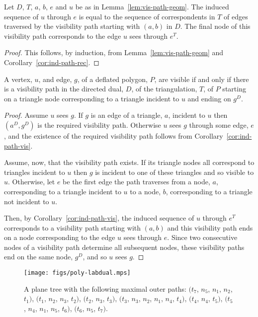 \documentclass{patmorin}
\begin{document}
\begin{cor}
  \label{cor:ind-path-vis}
  Let $D$, $T$, $a$, $b$, $e$ and $u$ be as in
  Lemma~\ref{lem:vis-path-geom}.  The induced sequence of $u$ through
  $e$ is equal to the sequence of correspondents in $T$ of edges
  traversed by the visibility path starting with $(a,b)$ in $D$.  The
  final node of this visibility path corresponds to the edge $u$ sees
  through $e^T$.
\end{cor}
\iffullversion
\begin{proof}
  This follows, by induction, from Lemma~\ref{lem:vis-path-geom} and
  Corollary~\ref{cor:ind-path-rec}.
\end{proof}
\fi

\begin{theorem}
  \label{thm:dd-det-ve}
  A vertex, $u$, and edge, $g$, of a deflated polygon, $P$, are
  visible if and only if there is a visibility path in the directed
  dual, $D$, of the triangulation, $T$, of $P$ starting on a triangle
  node corresponding to a triangle incident to $u$ and ending on
  $g^D$.
\end{theorem}
\begin{proof}
  Assume $u$ sees $g$.  If $g$ is an edge of a triangle, $a$, incident
  to $u$ then $(a^D, g^D)$ is the required visibility path.  Otherwise
  $u$ sees $g$ through some edge, $e$, and the existence of the
  required visibility path follows from
  Corollary~\ref{cor:ind-path-vis}.
  
  Assume, now, that the visibility path exists.  If its triangle nodes
  all correspond to triangles incident to $u$ then $g$ is incident to
  one of these triangles and so visible to $u$.  Otherwise, let $e$ be
  the first edge the path traverses from a node, $a$, corresponding to
  a triangle incident to $u$ to a node, $b$, corresponding to a
  triangle not incident to $u$.
  
  Then, by Corollary~\ref{cor:ind-path-vis}, the induced sequence of
  $u$ through $e^T$ corresponds to a visibility path starting with
  $(a, b)$ and this visibility path ends on a node corresponding to
  the edge $u$ sees through $e$.  Since two consecutive nodes of a
  visibility path determine all subsequent nodes, these visibility
  paths end on the same node, $g^D$, and so $u$ sees $g$.
\end{proof}


\begin{figure}[htb]
  \centering \texttt{[image: figs/poly-labdual.mps]}
  \caption{A plane tree with the following maximal outer paths:
    $(t_7$, $n_5$, $n_1$, $n_2$, $t_1)$, $(t_1$, $n_2$, $n_3$, $t_2)$,
    $(t_2$, $n_3$, $t_3)$, $(t_3$, $n_3$, $n_2$, $n_1$, $n_4$, $t_4)$,
    $(t_4$, $n_4$, $t_5)$, $(t_5$, $n_4$, $n_1$, $n_5$, $t_6)$,
    $(t_6$, $n_5$, $t_7)$.}
  \label{fig:outer-path}
\end{figure}
\end{document}
